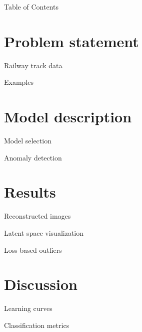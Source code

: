 \documentclass[aspectratio=169]{beamer}
\begin{document}
\begin{frame}{Table of Contents}
    \tableofcontents
\end{frame}

\section{Problem statement}
\begin{frame}{Railway track data}

\end{frame}

\begin{frame}{Examples}

\end{frame}

\section{Model description}
\begin{frame}{Model selection}

\end{frame}

\begin{frame}{Anomaly detection}

\end{frame}

\section{Results}
\begin{frame}{Reconstructed images}

\end{frame}

\begin{frame}{Latent space visualization}

\end{frame}

\begin{frame}{Loss based outliers}

\end{frame}

\section{Discussion}
\begin{frame}{Learning curves}

\end{frame}

\begin{frame}{Classification metrics}

\end{frame}
\end{document}
